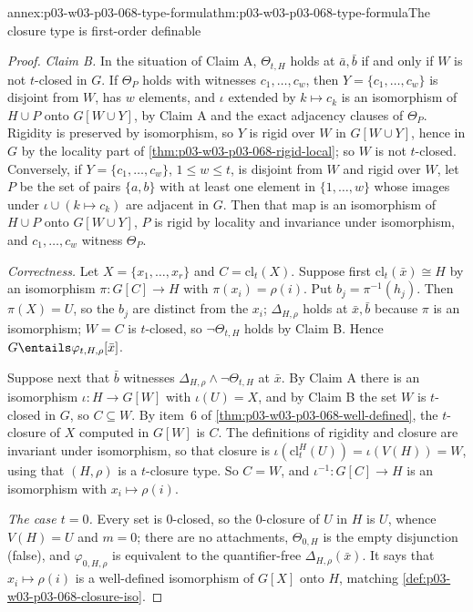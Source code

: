 \begin{annexitem}{annex:p03-w03-p03-068-type-formula}{thm:p03-w03-p03-068-type-formula}{The closure type is first-order definable}
\begin{proof}
\emph{Claim B.}  In the situation of Claim A, \(\Theta_{t,H}\) holds at
\(\bar a,\bar b\) if and only if \(W\) is not \(t\)-closed in \(G\).  If
\(\Theta_P\) holds with witnesses \(c_1,\ldots,c_w\), then
\(Y=\{c_1,\ldots,c_w\}\) is disjoint from \(W\), has \(w\) elements, and
\(\iota\) extended by \(k\mapsto c_k\) is an isomorphism of \(H\cup P\) onto
\(G[W\cup Y]\), by Claim A and the exact adjacency clauses of \(\Theta_P\).
Rigidity is preserved by isomorphism, so \(Y\) is rigid over \(W\) in
\(G[W\cup Y]\), hence in \(G\) by the locality part of
\cref{thm:p03-w03-p03-068-rigid-local}; so \(W\) is not \(t\)-closed.
Conversely, if \(Y=\{c_1,\ldots,c_w\}\), \(1\leq w\leq t\), is disjoint from
\(W\) and rigid over \(W\), let \(P\) be the set of pairs \(\{a,b\}\) with at
least one element in \(\{1,\ldots,w\}\) whose images under
\(\iota\cup(k\mapsto c_k)\) are adjacent in \(G\).  Then that map is an
isomorphism of \(H\cup P\) onto \(G[W\cup Y]\), \(P\) is rigid by locality and
invariance under isomorphism, and \(c_1,\ldots,c_w\) witness \(\Theta_P\).

\emph{Correctness.}  Let \(X=\{x_1,\ldots,x_r\}\) and \(C=\mathrm{cl}_t(X)\).
Suppose first \(\mathrm{cl}_t(\bar x)\cong H\) by an isomorphism
\(\pi\colon G[C]\to H\) with \(\pi(x_i)=\rho(i)\).  Put
\(b_j=\pi^{-1}(h_j)\).  Then \(\pi(X)=U\), so the \(b_j\) are distinct from
the \(x_i\); \(\Delta_{H,\rho}\) holds at \(\bar x,\bar b\) because \(\pi\) is an
isomorphism; \(W=C\) is \(t\)-closed, so \(\neg\Theta_{t,H}\) holds by Claim B.
Hence \(G\entails\varphi_{t,H,\rho}[\bar x]\).

Suppose next that \(\bar b\) witnesses \(\Delta_{H,\rho}\wedge\neg\Theta_{t,H}\)
at \(\bar x\).  By Claim A there is an isomorphism \(\iota\colon H\to G[W]\)
with \(\iota(U)=X\), and by Claim B the set \(W\) is \(t\)-closed in \(G\), so
\(C\subseteq W\).  By item~6 of \cref{thm:p03-w03-p03-068-well-defined}, the
\(t\)-closure of \(X\) computed in \(G[W]\) is \(C\).  The definitions of
rigidity and closure are invariant under isomorphism, so that closure is
\(\iota(\mathrm{cl}^H_t(U))=\iota(V(H))=W\), using that \((H,\rho)\) is a
\(t\)-closure type.  So \(C=W\), and \(\iota^{-1}\colon G[C]\to H\) is an
isomorphism with \(x_i\mapsto\rho(i)\).

\emph{The case \(t=0\).}  Every set is \(0\)-closed, so the \(0\)-closure of
\(U\) in \(H\) is \(U\), whence \(V(H)=U\) and \(m=0\); there are no
attachments, \(\Theta_{0,H}\) is the empty disjunction (false), and
\(\varphi_{0,H,\rho}\) is equivalent to the quantifier-free
\(\Delta_{H,\rho}(\bar x)\).  It says that \(x_i\mapsto\rho(i)\) is a well-defined
isomorphism of \(G[X]\) onto \(H\), matching
\cref{def:p03-w03-p03-068-closure-iso}.


\end{proof}
\end{annexitem}

